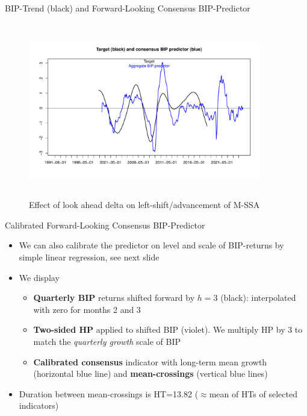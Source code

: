 \documentclass{beamer}
\begin{document}
\begin{frame} {BIP-Trend (black) and Forward-Looking Consensus BIP-Predictor}
\begin{figure}[H]\begin{center}\includegraphics[height=3in, width=4in]{bip_predictor2.pdf}\caption{Effect of look ahead delta on  left-shift/advancement of M-SSA\label{cor}}\end{center}\end{figure}\end{frame}


\begin{frame} {Calibrated Forward-Looking Consensus BIP-Predictor}
\begin{itemize}
\item We can also calibrate the predictor on level and scale of BIP-returns by simple linear regression, see next slide
\item We display
\begin{itemize}
\item \textbf{Quarterly BIP} returns shifted forward by $h=3$ (black): interpolated with zero for months 2 and 3
\item \textbf{Two-sided HP} applied to shifted BIP (violet). We multiply HP by 3 to match the \emph{quarterly growth} scale of BIP
\item \textbf{Calibrated consensus} indicator with long-term mean growth (horizontal blue line) and \textbf{mean-crossings} (vertical blue lines)
\end{itemize}
\item Duration between mean-crossings is HT=13.82 ($\approx$mean of HTs of selected indicators)
\end{itemize}
\end{frame}
\end{document}

